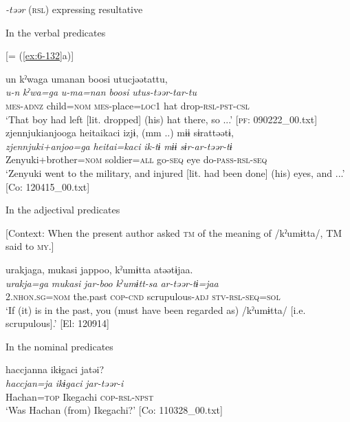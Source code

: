 \ea\label{ex:8-138}
  \textit{-təər} (\textsc{rsl}) expressing resultative

  In the verbal predicates

\ea {}[= (\ref{ex:6-132}a)]

{\TM}
\glll  un  kˀwaga  umanan  {\textbar}boosi{\textbar}  utucjəətattu,\\
\textit{u-n}  \textit{kˀwa=ga}  \textit{u-ma=nan}  \textit{boosi}  \textit{utus-təər-tar-tu}\\
\textsc{mes}-\textsc{adnz}  child=\textsc{nom}  \textsc{mes}-place=\textsc{loc1}  hat  drop-\textsc{rsl}-\textsc{pst}-\textsc{csl}\\
\glt ‘That boy had left [lit. dropped] (his) hat there, so ...’ [\textsc{pf}: 090222\_00.txt]
\ex
{\TM}
\glll  zjennjukianjooga  {\textbar}heitai{\textbar}kaci  izjɨ,  (mm ..)  mɨɨ      sɨrattəətɨ,        \\
\textit{zjennjuki+anjoo=ga}  \textit{heitai=kaci}  \textit{ik-tɨ}    \textit{mɨɨ}      \textit{sɨr-ar-təər-tɨ}\\
Zenyuki+brother=\textsc{nom}  soldier=\textsc{all}  go-\textsc{seq}    eye     do-\textsc{pass}-\textsc{rsl}-\textsc{seq}\\
\glt ‘Zenyuki went to the military, and injured [lit. had been done] (his) eyes, and ...’ [Co: 120415\_00.txt]

  In the adjectival predicates


\ex {}[Context: When the present author asked \textsc{tm} of the meaning of /kˀumɨtta/, TM said to \textsc{my}.]

{\TM}
\glll  urakjaga,  mukasi  jappoo,  kˀumɨtta      atəətɨjaa.\\
\textit{urakja=ga}  \textit{mukasi}  \textit{jar-boo}  \textit{kˀumɨtt-sa}      \textit{ar-təər-tɨ=jaa}\\
2.\textsc{nhon}.\textsc{sg}=\textsc{nom}  the.past  \textsc{cop}-\textsc{cnd}  scrupulous-\textsc{adj}   \textsc{stv}-\textsc{rsl}-\textsc{seq}=\textsc{sol}\\
\glt ‘If (it) is in the past, you (must have been regarded as) /kˀumɨtta/ [i.e. scrupulous].’ [El: 120914]

  In the nominal predicates

\ex
{\US}
\glll   haccjanna  ikɨgaci  jatəi?\\
\textit{haccjan=ja}  \textit{ikɨgaci}  \textit{jar-təər-i}\\
Hachan=\textsc{top}  Ikegachi  \textsc{cop}-\textsc{rsl}-\textsc{npst}\\
\glt ‘Was Hachan (from) Ikegachi?’ [Co: 110328\_00.txt]
\z
\z

